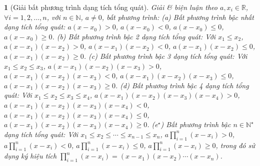 \documentclass{article}
\newtheorem{baitoan}{}
\begin{document}
\begin{baitoan}[Giải bất phương trình dạng tích tổng quát]
	Giải \& biện luận theo $a,x_i\in\mathbb{R}$, $\forall i = 1,2,\ldots,n$, với $n\in\mathbb{N}$, $a\ne0$, bất phương trình: (a) {\rm Bất phương trình bậc nhất dạng tích tổng quát:} $a(x - x_0) > 0$, $a(x - x_0) < 0$, $a(x - x_0)\le0$, $a(x - x_0)\ge0$. (b) {\rm Bất phương trình bậc 2 dạng tích tổng quát:} Với $x_1\le x_2$, $a(x - x_1)(x - x_2) > 0$, $a(x - x_1)(x - x_2) < 0$, $a(x - x_1)(x - x_2)\le0$, $a(x - x_1)(x - x_2)\ge0$. (c) {\rm Bất phương trình bậc 3 dạng tích tổng quát:} Với $x_1\le x_2\le x_3$, $a(x - x_1)(x - x_2)(x - x_3) > 0$, $a(x - x_1)(x - x_2)(x - x_3) < 0$, $a(x - x_1)(x - x_2)(x - x_3)\le0$, $a(x - x_1)(x - x_2)(x - x_3)\ge0$. (d) {\rm Bất phương trình bậc 4 dạng tích tổng quát:} Với $x_1\le x_2\le x_3\le x_4$, $a(x - x_1)(x - x_2)(x - x_3)(x - x_4) > 0$, $a(x - x_1)(x - x_2)(x - x_3)(x - x_4) < 0$, $a(x - x_1)(x - x_2)(x - x_3)(x - x_4)\le0$, $a(x - x_1)(x - x_2)(x - x_3)(x - x_4)\ge0$. (e${}^\star$) {\rm Bất phương trình bậc $n\in\mathbb{N}^\star$ dạng tích tổng quát:} Với $x_1\le x_2\le\cdots\le x_{n-1}\le x_n$, $a\prod_{i=1}^n (x - x_i) > 0$, $a\prod_{i=1}^n (x - x_i) < 0$, $a\prod_{i=1}^n (x - x_i)\le0$, $a\prod_{i=1}^n (x - x_i)\ge0$, trong đó sử dụng ký hiệu tích $\prod_{i=1}^n (x - x_i) = (x - x_1)(x - x_2)\cdots(x - x_n)$.
\end{baitoan}
\end{document}
